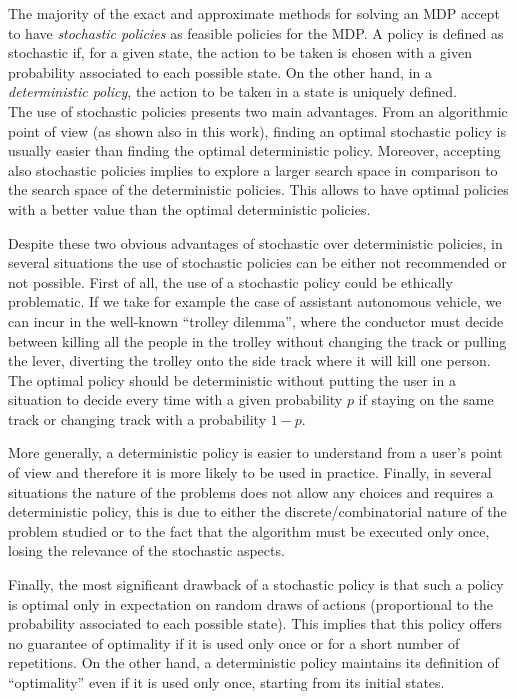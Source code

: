 \documentclass[sigconf]{aamas}  %
\begin{document}
The majority of the exact and approximate methods for solving an MDP accept to have \textit{stochastic policies} as feasible policies for the MDP. A policy is defined as stochastic if, for a given state, the action to be taken is chosen with a given probability associated to each possible state.
On the other hand, in a \textit{deterministic policy}, the action to be taken in a state is uniquely defined.\\
The use of stochastic policies presents two main advantages. From an algorithmic point of view (as shown also in this work), finding an optimal stochastic policy is usually easier than finding the optimal deterministic policy. Moreover, accepting also stochastic policies implies to explore a larger search space in comparison to the search space of the deterministic policies. This allows to have optimal policies with a better value than the optimal deterministic policies.

Despite these two obvious advantages of stochastic over deterministic policies, in several situations the use of stochastic policies can be either not recommended or not possible. 
%
%
First of all, the use of a stochastic policy could be ethically problematic. If we take for example the case of assistant autonomous vehicle, we can incur in the well-known ``trolley dilemma'', where the conductor must decide between killing all the people in the trolley without changing the track or pulling the lever, diverting the trolley onto the side track where it will kill one person. The optimal policy should be deterministic without putting the user in a situation to decide every time with a given probability $p$ if staying on the same track or changing track with a probability $1-p$. 

More generally, a deterministic policy is easier to understand from a user's point of view and therefore it is more likely to be used in practice. Finally, in several situations the nature of the problems does not allow any choices and requires a deterministic policy, this is due to either the discrete/combinatorial nature of the problem studied or to the fact that the algorithm must be executed only once, losing the relevance of the stochastic aspects. 

Finally, the most significant drawback of a stochastic policy is that  such a policy is  optimal only in expectation on random draws of actions (proportional to the  probability associated to
each possible state). This implies that 
this policy offers no guarantee of optimality if it is used only once or for a short number of repetitions. On the other hand, a deterministic policy maintains its definition of ``optimality'' even if it is used only once, starting from its initial states.
\end{document}
